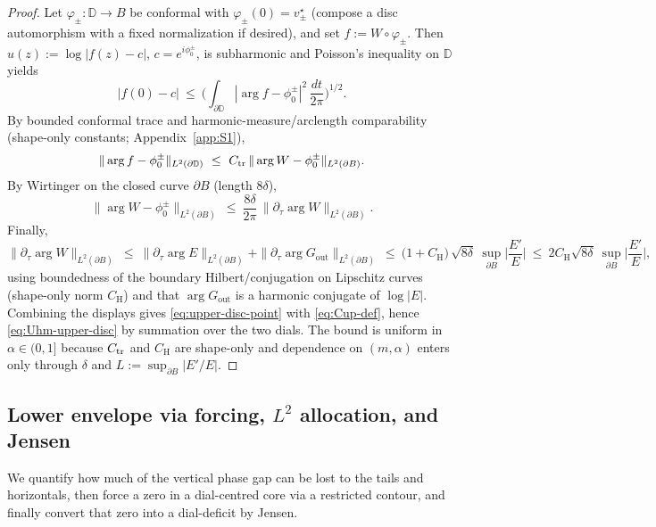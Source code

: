 \documentclass[11pt]{article}
\numberwithin{equation}{section}
\theoremstyle{remark}
\newcommand{\D}{\mathbb{D}}
\newcommand{\Gout}{G_{\mathrm{out}}}
\begin{document}
\begin{proof}
Let $\varphi_\pm:\D\to B$ be conformal with $\varphi_\pm(0)=v_\pm^\star$ (compose a disc automorphism with a fixed normalization if desired), and set $f:=W\circ\varphi_\pm$.
Then $u(z):=\log|f(z)-c|$, $c=e^{i\phi_0^\pm}$, is subharmonic and Poisson’s inequality on $\D$ yields
\[
|f(0)-c|\ \le\ \Big(\int_{\partial\D}|\arg f-\phi_0^\pm|^2\,\frac{dt}{2\pi}\Big)^{1/2}.
\]
By bounded conformal trace and harmonic-measure/arclength comparability (shape-only constants; Appendix~\ref{app:S1}),
\[
\|\arg f-\phi_0^\pm\|_{L^2(\partial\D)}\ \le\ C_{\rm tr}\,\|\arg W-\phi_0^\pm\|_{L^2(\partial B)}.
\]
By Wirtinger on the closed curve $\partial B$ (length $8\delta$),
\[
\|\arg W-\phi_0^\pm\|_{L^2(\partial B)}\ \le\ \frac{8\delta}{2\pi}\,\|\partial_\tau\arg W\|_{L^2(\partial B)}.
\]
Finally,
\[
\|\partial_\tau\arg W\|_{L^2(\partial B)}\ \le\ \|\partial_\tau\arg E\|_{L^2(\partial B)}+\|\partial_\tau\arg \Gout\|_{L^2(\partial B)}
\ \le\ \big(1+C_{\mathrm H}\big)\,\sqrt{8\delta}\ \sup_{\partial B}\Big|\frac{E'}{E}\Big|
\ \le\ 2C_{\mathrm H}\sqrt{8\delta}\ \sup_{\partial B}\Big|\frac{E'}{E}\Big|, %
\]
using boundedness of the boundary Hilbert/conjugation on Lipschitz curves (shape-only norm $C_{\mathrm H}$) and that $\arg \Gout$ is a harmonic conjugate of $\log|E|$. Combining the displays gives \eqref{eq:upper-disc-point} with \eqref{eq:Cup-def}, hence \eqref{eq:Uhm-upper-disc} by summation over the two dials. The bound is uniform in $\alpha\in(0,1]$ because $C_{\rm tr}$ and $C_{\mathrm H}$ are shape-only and dependence on $(m,\alpha)$ enters only through $\delta$ and $L:=\sup_{\partial B}|E'/E|$.
\end{proof}

\subsection{Lower envelope via forcing, $L^2$ allocation, and Jensen}\label{subsec:lower-new}

We quantify how much of the vertical phase gap can be lost to the tails and horizontals, then force a zero in a dial-centred core via a restricted contour, and finally convert that zero into a dial-deficit by Jensen.
\end{document}
